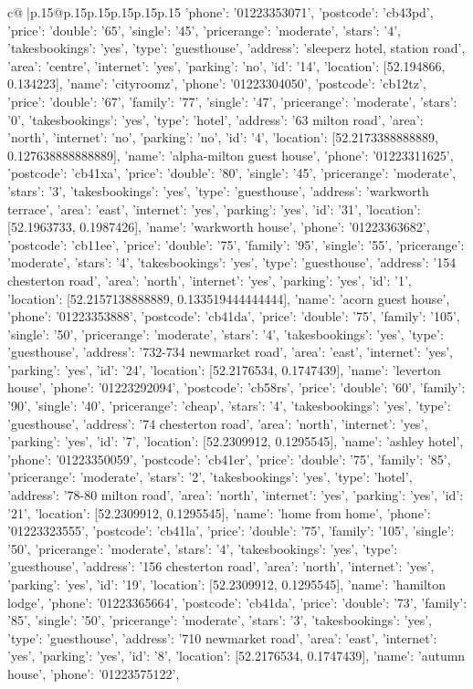 \documentclass{article}
\begin{document}
{\begin{supertabular}{c@{$\;$}|p{.15\linewidth}@{}p{.15\linewidth}p{.15\linewidth}p{.15\linewidth}p{.15\linewidth}p{.15\linewidth}}
{{{'phone': '01223353071', 'postcode': 'cb43pd', 'price': {'double': '65', 'single': '45'}, 'pricerange': 'moderate', 'stars': '4', 'takesbookings': 'yes', 'type': 'guesthouse'}, {'address': 'sleeperz hotel, station road', 'area': 'centre', 'internet': 'yes', 'parking': 'no', 'id': '14', 'location': [52.194866, 0.134223], 'name': 'cityroomz', 'phone': '01223304050', 'postcode': 'cb12tz', 'price': {'double': '67', 'family': '77', 'single': '47'}, 'pricerange': 'moderate', 'stars': '0', 'takesbookings': 'yes', 'type': 'hotel'}, {'address': '63 milton road', 'area': 'north', 'internet': 'no', 'parking': 'no', 'id': '4', 'location': [52.2173388888889, 0.127638888888889], 'name': 'alpha-milton guest house', 'phone': '01223311625', 'postcode': 'cb41xa', 'price': {'double': '80', 'single': '45'}, 'pricerange': 'moderate', 'stars': '3', 'takesbookings': 'yes', 'type': 'guesthouse'}, {'address': 'warkworth terrace', 'area': 'east', 'internet': 'yes', 'parking': 'yes', 'id': '31', 'location': [52.1963733, 0.1987426], 'name': 'warkworth house', 'phone': '01223363682', 'postcode': 'cb11ee', 'price': {'double': '75', 'family': '95', 'single': '55'}, 'pricerange': 'moderate', 'stars': '4', 'takesbookings': 'yes', 'type': 'guesthouse'}, {'address': '154 chesterton road', 'area': 'north', 'internet': 'yes', 'parking': 'yes', 'id': '1', 'location': [52.2157138888889, 0.133519444444444], 'name': 'acorn guest house', 'phone': '01223353888', 'postcode': 'cb41da', 'price': {'double': '75', 'family': '105', 'single': '50'}, 'pricerange': 'moderate', 'stars': '4', 'takesbookings': 'yes', 'type': 'guesthouse'}, {'address': '732-734 newmarket road', 'area': 'east', 'internet': 'yes', 'parking': 'yes', 'id': '24', 'location': [52.2176534, 0.1747439], 'name': 'leverton house', 'phone': '01223292094', 'postcode': 'cb58rs', 'price': {'double': '60', 'family': '90', 'single': '40'}, 'pricerange': 'cheap', 'stars': '4', 'takesbookings': 'yes', 'type': 'guesthouse'}, {'address': '74 chesterton road', 'area': 'north', 'internet': 'yes', 'parking': 'yes', 'id': '7', 'location': [52.2309912, 0.1295545], 'name': 'ashley hotel', 'phone': '01223350059', 'postcode': 'cb41er', 'price': {'double': '75', 'family': '85'}, 'pricerange': 'moderate', 'stars': '2', 'takesbookings': 'yes', 'type': 'hotel'}, {'address': '78-80 milton road', 'area': 'north', 'internet': 'yes', 'parking': 'yes', 'id': '21', 'location': [52.2309912, 0.1295545], 'name': 'home from home', 'phone': '01223323555', 'postcode': 'cb41la', 'price': {'double': '75', 'family': '105', 'single': '50'}, 'pricerange': 'moderate', 'stars': '4', 'takesbookings': 'yes', 'type': 'guesthouse'}, {'address': '156 chesterton road', 'area': 'north', 'internet': 'yes', 'parking': 'yes', 'id': '19', 'location': [52.2309912, 0.1295545], 'name': 'hamilton lodge', 'phone': '01223365664', 'postcode': 'cb41da', 'price': {'double': '73', 'family': '85', 'single': '50'}, 'pricerange': 'moderate', 'stars': '3', 'takesbookings': 'yes', 'type': 'guesthouse'}, {'address': '710 newmarket road', 'area': 'east', 'internet': 'yes', 'parking': 'yes', 'id': '8', 'location': [52.2176534, 0.1747439], 'name': 'autumn house', 'phone': '01223575122', }}}
\end{supertabular}}
\end{document}
